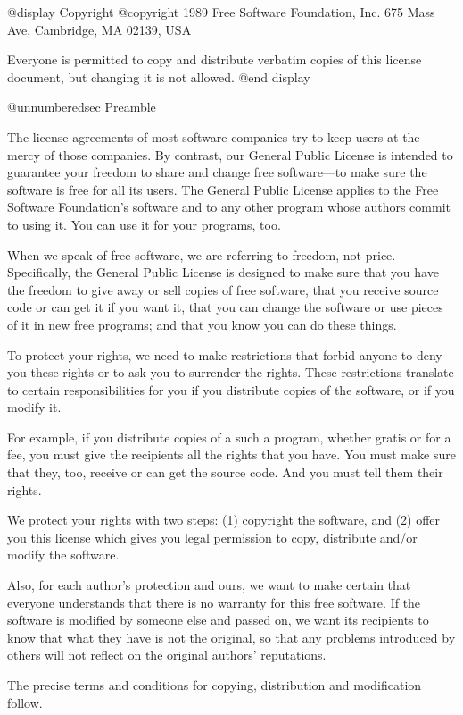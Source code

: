 @display
Copyright @copyright{} 1989 Free Software Foundation, Inc.
675 Mass Ave, Cambridge, MA 02139, USA

Everyone is permitted to copy and distribute verbatim copies
of this license document, but changing it is not allowed.
@end display

@unnumberedsec Preamble

  The license agreements of most software companies try to keep users
at the mercy of those companies.  By contrast, our General Public
License is intended to guarantee your freedom to share and change free
software---to make sure the software is free for all its users.  The
General Public License applies to the Free Software Foundation's
software and to any other program whose authors commit to using it.
You can use it for your programs, too.

  When we speak of free software, we are referring to freedom, not
price.  Specifically, the General Public License is designed to make
sure that you have the freedom to give away or sell copies of free
software, that you receive source code or can get it if you want it,
that you can change the software or use pieces of it in new free
programs; and that you know you can do these things.

  To protect your rights, we need to make restrictions that forbid
anyone to deny you these rights or to ask you to surrender the rights.
These restrictions translate to certain responsibilities for you if you
distribute copies of the software, or if you modify it.

  For example, if you distribute copies of a such a program, whether
gratis or for a fee, you must give the recipients all the rights that
you have.  You must make sure that they, too, receive or can get the
source code.  And you must tell them their rights.

  We protect your rights with two steps: (1) copyright the software, and
(2) offer you this license which gives you legal permission to copy,
distribute and/or modify the software.

  Also, for each author's protection and ours, we want to make certain
that everyone understands that there is no warranty for this free
software.  If the software is modified by someone else and passed on, we
want its recipients to know that what they have is not the original, so
that any problems introduced by others will not reflect on the original
authors' reputations.

  The precise terms and conditions for copying, distribution and
modification follow.

